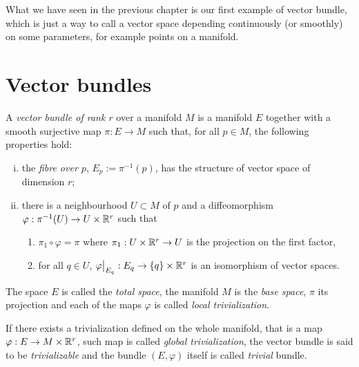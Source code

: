 What we have seen in the previous chapter is our first example of vector bundle, which is just a way to call a vector space depending continuously (or smoothly) on some parameters, for example points on a manifold.

\section{Vector bundles}\label{sec:vec-bdls}

\begin{definition}\label{def:vector_bundle}
	A \emph{vector bundle of rank $r$} over a manifold $M$ is a manifold $E$ together with a smooth surjective map $\pi : E \to M$ such that, for all $p\in M$, the following properties hold:
	\begin{enumerate}[(i)]
		\item the \emph{fibre over $p$}, $E_p := \pi^{-1}(p)$, has the structure of vector space of dimension $r$;
		\item there is a neighbourhood $U\subset M$ of $p$ and a diffeomorphism $\varphi: \pi^{-1}(U) \to U \times \mathbb{R}^r$ such that
		      \begin{enumerate}
			      \item $\pi_1 \circ \varphi = \pi$ where $\pi_1: U\times\mathbb{R}^r\to U$ is the projection on the first factor,
			      \item for all $q\in U$, $\varphi\big|_{E_q} : E_q \to \{q\}\times \mathbb{R}^r$ is an isomorphism of vector spaces.
		      \end{enumerate}
	\end{enumerate}

	The space $E$ is called the \emph{total space}, the manifold $M$ is the \emph{base space}, $\pi$ its projection and each of the maps $\varphi$ is called \emph{local trivialization}.

	If there exists a trivialization defined on the whole manifold, that is a map $\varphi: E \to M\times \mathbb{R}^r$, such map is called \emph{global trivialization}, the vector bundle is said to be \emph{trivializable} and the bundle $(E, \varphi)$ itself is called \emph{trivial} bundle.
\end{definition}

